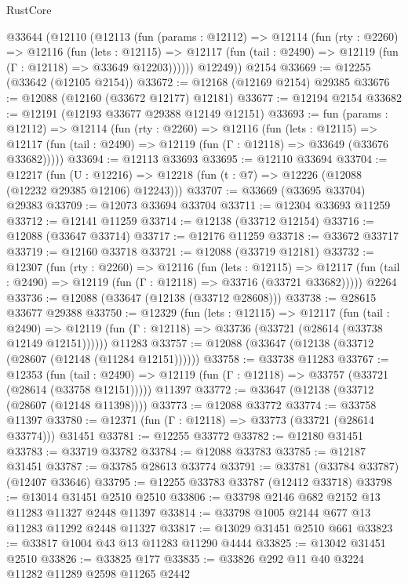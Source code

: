 \begin{lexlean}{RustCore}
\begin{coremodule}
    @33644
      (@12110
        (@12113
          (fun (params : @12112) =>
          @12114
            (fun (rty : @2260) =>
            @12116
              (fun (lets : @12115) =>
              @12117 (fun (tail : @2490) => @12119 (fun (Γ : @12118) => @33649 @12203))))))
        @12249))
    @2154
@33669 := @12255 (@33642 (@12105 @2154))
@33672 := @12168 (@12169 @2154) @29385
@33676 := @12088 (@12160 (@33672 @12177) @12181)
@33677 := @12194 @2154
@33682 := @12191 (@12193 @33677 @29388 @12149 @12151)
@33693 := fun (params : @12112) =>
  @12114
    (fun (rty : @2260) =>
    @12116
      (fun (lets : @12115) =>
      @12117 (fun (tail : @2490) => @12119 (fun (Γ : @12118) => @33649 (@33676 @33682)))))
@33694 := @12113 @33693
@33695 := @12110 @33694
@33704 := @12217
    (fun (U : @12216) => @12218 (fun (t : @7) => @12226 (@12088 (@12232 @29385 @12106) @12243)))
@33707 := @33669 (@33695 @33704) @29383
@33709 := @12073 @33694 @33704
@33711 := @12304 @33693 @11259
@33712 := @12141 @11259
@33714 := @12138 (@33712 @12154)
@33716 := @12088 (@33647 @33714)
@33717 := @12176 @11259
@33718 := @33672 @33717
@33719 := @12160 @33718
@33721 := @12088 (@33719 @12181)
@33732 := @12307
    (fun (rty : @2260) =>
    @12116
      (fun (lets : @12115) =>
      @12117 (fun (tail : @2490) => @12119 (fun (Γ : @12118) => @33716 (@33721 @33682)))))
    @2264
@33736 := @12088 (@33647 (@12138 (@33712 @28608)))
@33738 := @28615 @33677 @29388
@33750 := @12329
    (fun (lets : @12115) =>
    @12117
      (fun (tail : @2490) =>
      @12119 (fun (Γ : @12118) => @33736 (@33721 (@28614 (@33738 @12149 @12151))))))
    @11283
@33757 := @12088 (@33647 (@12138 (@33712 (@28607 (@12148 (@11284 @12151))))))
@33758 := @33738 @11283
@33767 := @12353
    (fun (tail : @2490) => @12119 (fun (Γ : @12118) => @33757 (@33721 (@28614 (@33758 @12151)))))
    @11397
@33772 := @33647 (@12138 (@33712 (@28607 (@12148 @11398))))
@33773 := @12088 @33772
@33774 := @33758 @11397
@33780 := @12371 (fun (Γ : @12118) => @33773 (@33721 (@28614 @33774))) @31451
@33781 := @12255 @33772
@33782 := @12180 @31451
@33783 := @33719 @33782
@33784 := @12088 @33783
@33785 := @12187 @31451
@33787 := @33785 @28613 @33774
@33791 := @33781 (@33784 @33787) (@12407 @33646)
@33795 := @12255 @33783 @33787 (@12412 @33718)
@33798 := @13014 @31451 @2510 @2510
@33806 := @33798 @2146 @682 @2152 @13 @11283 @11327 @2448 @11397
@33814 := @33798 @1005 @2144 @677 @13 @11283 @11292 @2448 @11327
@33817 := @13029 @31451 @2510 @661
@33823 := @33817 @1004 @43 @13 @11283 @11290 @4444
@33825 := @13042 @31451 @2510
@33826 := @33825 @177
@33835 := @33826 @292 @11 @40 @3224 @11282 @11289 @2598 @11265 @2442

\end{coremodule}
\end{lexlean}
